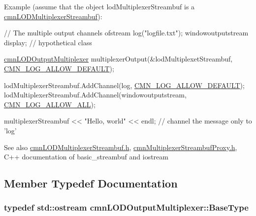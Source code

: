Example (assume that the object lod\+Multiplexer\+Streambuf is a \hyperlink{classcmn_l_o_d_multiplexer_streambuf}{cmn\+L\+O\+D\+Multiplexer\+Streambuf})\+:


\begin{DoxyCode}
\textcolor{comment}{// The multiple output channels}
ofstream log(\textcolor{stringliteral}{"logfile.txt"});
windowoutputstream display;  \textcolor{comment}{// hypothetical class}

\hyperlink{classcmn_l_o_d_output_multiplexer}{cmnLODOutputMultiplexer} multiplexerOutput(&lodMultiplexetStreambuf, 
      \hyperlink{cmn_log_lo_d_8h_a941e5ff3075571f0ad1e53e1204bd856}{CMN\_LOG\_ALLOW\_DEFAULT});

lodMultiplexerStreambuf.AddChannel(log, \hyperlink{cmn_log_lo_d_8h_a941e5ff3075571f0ad1e53e1204bd856}{CMN\_LOG\_ALLOW\_DEFAULT});
lodMultiplexerStreambuf.AddChannel(windowoutputstream, \hyperlink{cmn_log_lo_d_8h_acf03c43c8a0fbe1c13b2aa4ac3b0a856}{CMN\_LOG\_ALLOW\_ALL});

multiplexerStreambuf << \textcolor{stringliteral}{"Hello, world"} << endl;  \textcolor{comment}{// channel the message only to 'log'}
\end{DoxyCode}


\begin{DoxySeeAlso}{See also}
\hyperlink{cmn_l_o_d_multiplexer_streambuf_8h}{cmn\+L\+O\+D\+Multiplexer\+Streambuf.\+h}, \hyperlink{cmn_multiplexer_streambuf_proxy_8h}{cmn\+Multiplexer\+Streambuf\+Proxy.\+h}, C++ documentation of basic\+\_\+streambuf and iostream 
\end{DoxySeeAlso}


\subsection{Member Typedef Documentation}
\hypertarget{classcmn_l_o_d_output_multiplexer_a5c02280584b487c3d478b0fee8f829ef}{}
\subsubsection[{Base\+Type}]{\setlength{\rightskip}{0pt plus 5cm}typedef std\+::ostream {\bf cmn\+L\+O\+D\+Output\+Multiplexer\+::\+Base\+Type}}\label{classcmn_l_o_d_output_multiplexer_a5c02280584b487c3d478b0fee8f829ef}
\hypertarget{classcmn_l_o_d_output_multiplexer_a8228345f1af2deaa59cda6f4958c5b3b}{}
